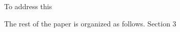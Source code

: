 To address this 




 
   





 
 






The rest of the paper is organized as follows. Section 3 
